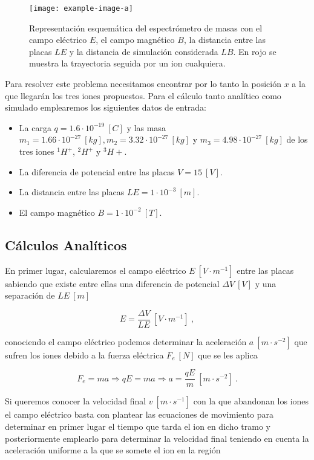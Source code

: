 \documentclass[journal]{IEEEtran}
\begin{document}
\begin{figure}[!htb]
    \texttt{[image: example-image-a]}
    \caption{Representación esquemática del espectrómetro de masas con el campo eléctrico $E$, el campo magnético $B$, la distancia entre las placas $LE$ y la distancia de simulación considerada $LB$. En rojo se muestra la trayectoria seguida por un ion cualquiera.}
    \label{fig:espetrometro}
\end{figure}

Para resolver este problema necesitamos encontrar por lo tanto la posición $x$ a la que llegarán los tres iones propuestos. Para el cálculo tanto analítico como simulado emplearemos los siguientes datos de entrada:

\begin{itemize}
    \item La carga $q = 1.6\cdot10^{-19}~[C]$ y las masa $m_1 = 1.66\cdot10^{-27}~[kg], m_2 = 3.32\cdot10^{-27}~[kg]$ y $m_3 = 4.98\cdot10^{-27}~[kg]$ de los tres iones $^1H^+$, $^2H^+$ y $^3H+$.
    \item La diferencia de potencial entre las placas $V = 15~[V]$.
    \item La distancia entre las placas $LE = 1\cdot 10^{-3}~[m]$.
    \item El campo magnético $B = 1\cdot10^{-2}~[T]$.
\end{itemize}

\subsection{Cálculos Analíticos}

En primer lugar, calcularemos el campo eléctrico $E~[V\cdot m^{-1}]$ entre las placas sabiendo que existe entre ellas una diferencia de potencial $\Delta V~[V]$ y una separación de $LE~[m]$

\begin{equation}
E = \displaystyle\frac{\Delta V}{LE}~[V\cdot m^{-1}]~,
\end{equation}

conociendo el campo eléctrico podemos determinar la aceleración $a~[m\cdot s^{-2}]$ que sufren los iones debido a la fuerza eléctrica $F_e~[N]$ que se les aplica

\begin{equation}
F_e = ma \Rightarrow qE = ma \Rightarrow a = \displaystyle\frac{qE}{m}~[m\cdot s^{-2}]~.
\end{equation}

Si queremos conocer la velocidad final $v~[m\cdot s^{-1}]$ con la que abandonan los iones el campo eléctrico basta con plantear las ecuaciones de movimiento para determinar en primer lugar el tiempo que tarda el ion en dicho tramo y posteriormente emplearlo para determinar la velocidad final teniendo en cuenta la aceleración uniforme a la que se somete el ion en la región
\end{document}
